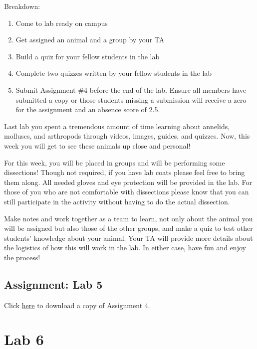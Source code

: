 \documentclass[
]{book}
\providecommand{\tightlist}{%
  \setlength{\itemsep}{0pt}\setlength{\parskip}{0pt}}
\begin{document}
Breakdown:

\begin{enumerate}
\def\labelenumi{\arabic{enumi}.}
\tightlist
\item
  Come to lab ready on campus
\item
  Get assigned an animal and a group by your TA
\item
  Build a quiz for your fellow students in the lab
\item
  Complete two quizzes written by your fellow students in the lab
\item
  Submit Assignment \#4 before the end of the lab. Ensure all members have submitted a copy or those students missing a submission will receive a zero for the assignment and an absence score of 2.5.
\end{enumerate}

Last lab you spent a tremendous amount of time learning about annelids, molluscs, and arthropods through videos, images, guides, and quizzes. Now, this week you will get to see these animals up close and personal!

For this week, you will be placed in groups and will be performing some dissections! Though not required, if you have lab coats please feel free to bring them along. All needed gloves and eye protection will be provided in the lab. For those of you who are not comfortable with dissections please know that you can still participate in the activity without having to do the actual dissection.

Make notes and work together as a team to learn, not only about the animal you will be assigned but also those of the other groups, and make a quiz to test other students' knowledge about your animal. Your TA will provide more details about the logistics of how this will work in the lab. In either case, have fun and enjoy the process!

\hypertarget{assignment-lab-5}{%
\chapter*{Assignment: Lab 5}\label{assignment-lab-5}}

Click \href{https://osf.io/download/rh8nv}{here} to download a copy of Assignment 4.

\hypertarget{part-lab-6}{%
\part*{Lab 6}\label{part-lab-6}}
\end{document}
